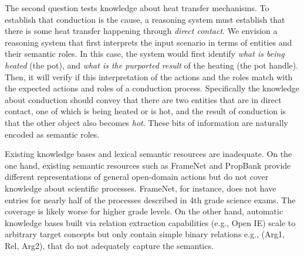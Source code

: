 The second question tests knowledge about heat transfer mechanisms.
To establish that conduction is the cause, a reasoning system must establish that there is some heat transfer happening through {\em direct contact}. 
We envision a reasoning system that first interprets the input scenario in terms of entities and their semantic roles. 
In this case, the system would first identify {\em what is being heated} (the pot), and {\em what is the purported result} of the heating (the pot handle). 
Then, it will verify if this interpretation of the actions and the roles match with the expected actions and roles of a conduction process. 
Specifically the knowledge about conduction should convey that there are two entities that are in direct contact, one of which is being heated or is hot, 
and the result of conduction is that the other object also becomes {\em hot}. 
These bits of information are naturally encoded as semantic roles.



Existing knowledge bases and lexical semantic resources are inadequate.
On the one hand, existing semantic resources such as FrameNet and PropBank provide different representations of 
general open-domain actions but do not cover knowledge about scientific processes. 
FrameNet, for instance, does not have entries for nearly half of the processes described in 4th grade science exams. 
The coverage is likely worse for higher grade levels. On the other hand, automatic knowledge bases built via relation extraction
capabilities (e.g., Open IE) scale to arbitrary target concepts but only contain simple binary relations e.g., (Arg1, Rel, Arg2), that do not adequately capture the semantics.




